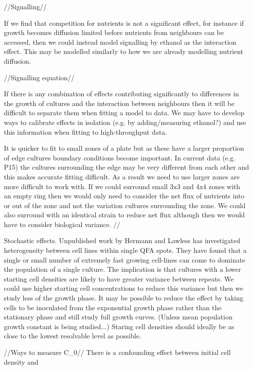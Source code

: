 //Signalling//

If we find that competition for nutrients is not a significant effect,
for instance if growth becomes diffusion limited before nutrients from
neighbours can be accessed, then we could instead model signalling by
ethanol as the interaction effect. This may be modelled similarly to
how we are already modelling nutrient diffusion.

//Signalling equation//

If there is any combination of effects contributing significantly to
differences in the growth of cultures and the interaction between
neighbours then it will be difficult to separate them when fitting a
model to data. We may have to develop ways to calibrate effects in
isolation (e.g. by adding/measuring ethanol?) and use this information
when fitting to high-throughput data.

It is quicker to fit to small zones of a plate but as these have a
larger proportion of edge cultures boundary conditions become
important. In current data (e.g. P15) the cultures surrounding the
edge may be very different from each other and this makes accurate
fitting difficult. As a result we need to use larger zones are more
difficult to work with. If we could surround small 3x3 and 4x4 zones
with an empty ring then we would only need to consider the net flux of
nutrients into or out of the zone and not the variation cultures
surrounding the zone. We could also surround with an identical strain
to reduce net flux although then we would have to consider biological
variance.
//

Stochastic effects. Unpublished work by Hermann and Lawless has
investigated heterogeneity between cell lines within single QFA
spots. They have found that a single or small number of extremely fast
growing cell-lines can come to dominate the population of a single
culture. The implication is that cultures with a lower starting cell
densities are likely to have greater variance between repeats. We
could use higher starting cell concentrations to reduce this variance
but then we study less of the growth phase. It may be possible to
reduce the effect by taking cells to be inoculated from the
exponential growth phase rather than the stationary phase and still
study full growth curves. (Unless mean population growth constant is
being studied...) Staring cell densities should ideally be as close to
the lowest resolvable level as possible.

//Ways to measure C_0//
There is a confounding effect between initial cell density and

